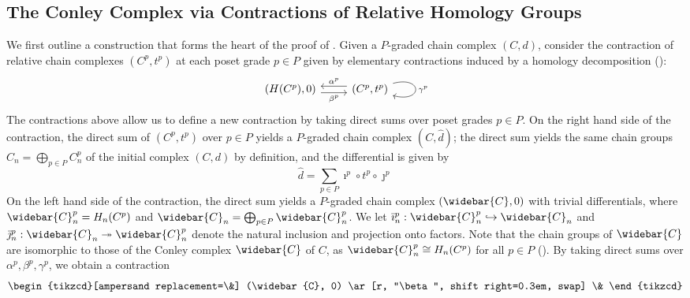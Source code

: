 \documentclass[11pt, table, nothms]{amsart}
\theoremstyle{definition}
\newcommand{\oC}{\widebar{C}}
\begin{document}
{\subsection{The Conley Complex via Contractions of Relative Homology Groups} \label{ssec:relhomperturb}
We first outline a construction that forms the heart of the proof of . Given a $P$-graded chain complex $(C,d)$, consider the contraction of relative chain complexes $(C^p, t^p)$ at each poset grade $p\in P$ given by elementary contractions induced by a homology decomposition ():
\begin{equation} \label{eq:contraction_relative}
\begin{tikzcd}[ampersand replacement=\&]
    (H(C^p), 0) \ar[r, "\beta^p", shift right=0.3em, swap] \&
    (C^p, t^p)
    \arrow[l, "\alpha^p", shift right=0.3em, swap]
    \arrow["\gamma^p", from=1-2, to=1-2, loop, in=345, out=15, distance=10mm]
\end{tikzcd}
\end{equation}
The contractions above allow us to define a new contraction by taking direct sums over poset grades $p \in P$. On the right hand side of the contraction, the direct sum of $(C^p, t^p)$ over $p \in P$ yields a $P$-graded chain complex $(C,\widehat{d})$; the direct sum yields the same chain groups $C_n = \bigoplus_{p \in P} C^p_n$ of the initial complex $(C,d)$ by definition, and the differential is given by 
\begin{equation}
    \widehat{d} = \sum_{p \in P} \imath^p \circ t^p \circ \jmath^p 
\end{equation}
On the left hand side of the contraction, the direct sum yields a $P$-graded chain complex $(\oC, 0)$ with trivial differentials, where $\oC^p_n = H_n(C^p)$ and $\oC_n = \bigoplus_{p \in P} \oC^p_n$. We let $\bar{\imath}_n^p: \oC^p_n \hookrightarrow \oC_n$ and $\bar{\jmath}_n^p:  \oC_n \twoheadrightarrow \oC^p_n$ denote the natural inclusion and projection onto factors. Note that the chain groups of $\oC$ are isomorphic to those of the Conley complex $\oC$ of $C$, as $\oC^p_n \cong H_n(C^p)$ for all $p \in P$ (). By taking direct sums over $\alpha^p, \beta^p, \gamma^p$, we obtain a contraction %
\begin{equation} 
\label{eq:Pgraded_elementary_contraction}
    \begin{tikzcd}[ampersand replacement=\&]
    (\oC, 0) \ar[r, "\beta", shift right=0.3em, swap] \&

\end{tikzcd}
\end{equation}}
\end{document}
